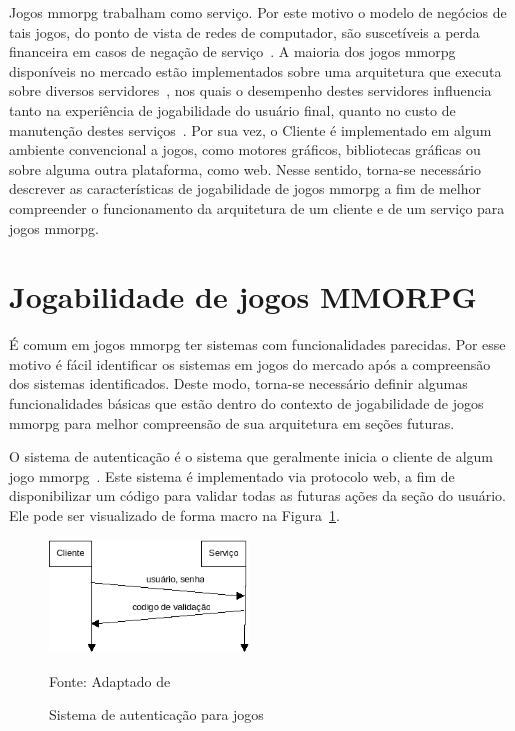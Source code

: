 Jogos \ac{mmorpg} trabalham como serviço. Por este motivo o modelo de negócios de tais jogos, do ponto de vista de redes de computador, são suscetíveis a perda financeira em casos de negação de serviço~\cite{1417630}.
%
A maioria dos jogos \ac{mmorpg} disponíveis no mercado estão implementados sobre uma arquitetura que executa sobre diversos servidores~\cite{stephenclarkewillson2017}, nos quais o desempenho destes servidores influencia tanto na experiência de jogabilidade do usuário final, quanto no custo de manutenção destes serviços~\cite{1417630}.
%
Por sua vez, o Cliente é implementado em algum ambiente convencional a jogos, como motores gráficos, bibliotecas gráficas ou sobre alguma outra plataforma, como web.
%
Nesse sentido, torna-se necessário descrever as características de jogabilidade de jogos \ac{mmorpg} a fim de melhor compreender o funcionamento da arquitetura de um cliente e de um serviço para jogos \ac{mmorpg}.



\section{Jogabilidade de jogos MMORPG}
\label{sec:jogabilidade}



É comum em jogos \ac{mmorpg} ter sistemas com funcionalidades parecidas.
%
Por esse motivo é fácil identificar os sistemas em jogos do mercado após a compreensão dos sistemas identificados.
%
Deste modo, torna-se necessário definir algumas funcionalidades básicas que estão dentro do contexto de jogabilidade de jogos \ac{mmorpg} para melhor compreensão de sua arquitetura em seções futuras.


O sistema de autenticação é o sistema que geralmente inicia o cliente de algum jogo \ac{mmorpg}~\cite{albion_online_unite, matthiasrudy2011}.
%
Este sistema é implementado via protocolo web, a fim de disponibilizar um código para validar todas as futuras ações da seção do usuário.
%
Ele pode ser visualizado de forma macro na Figura~\ref{fig:autenticacao}.

\begin{figure}[htb!]
\caption{Sistema de autenticação para jogos}
\label{fig:autenticacao}
\includegraphics[height=3cm]{img/cap2/autenticacao.png}
\centering

Fonte: Adaptado de ~\cite{LeckyThompson2008Nov}
\end{figure}


